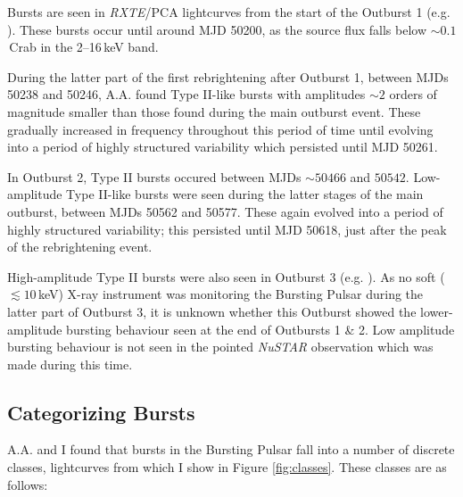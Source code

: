 \par Bursts are seen in \indexpca\textit{RXTE}/PCA lightcurves from the start of the Outburst 1 (e.g. \citealp{Kouveliotou_BP}).  These bursts occur until around MJD 50200, as the source flux falls below $\sim0.1$\,Crab in the 2--16\,keV band.  
\par During the latter part of the first rebrightening after Outburst 1, between MJDs 50238 and 50246, \textsf{A.A.} found Type II-like bursts with amplitudes $\sim2$ orders of magnitude smaller than those found during the main outburst event.  These gradually increased in frequency throughout this period of time until evolving into a period of highly structured variability which persisted until MJD 50261.
\par In Outburst 2, Type II bursts occured between MJDs $\sim50466$ and $50542$.  Low-amplitude Type II-like bursts were seen during the latter stages of the main outburst, between MJDs 50562 and 50577.  These again evolved into a period of highly structured variability; this persisted until MJD 50618, just after the peak of the rebrightening event.
\par High-amplitude Type II bursts were also seen in Outburst 3 (e.g. \citealp{Linares_NewBurst}).  As no soft ($\lesssim10\,$keV) X-ray instrument was monitoring the Bursting Pulsar during the latter part of Outburst 3, it is unknown whether this Outburst showed the lower-amplitude bursting behaviour seen at the end of Outbursts 1 \& 2.  Low amplitude bursting behaviour is not seen in the pointed \textit{NuSTAR} observation which was made during this time.

\subsection{Categorizing Bursts}

\label{sec:classes}

\par \textsf{A.A.} and I found that bursts in the Bursting Pulsar fall into a number of discrete classes, lightcurves from which I show in Figure \ref{fig:classes}.  These classes are as follows:

